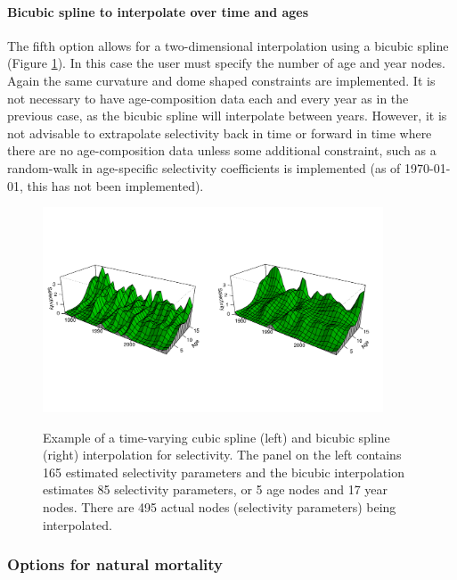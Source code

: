 \paragraph{Bicubic spline to interpolate over time and ages}  The fifth option allows for a two-dimensional interpolation using a bicubic spline (Figure \ref{Fig3}).  In this case the user must specify the number of age and year nodes.  Again the same curvature and dome shaped constraints are implemented.  It is not necessary to have age-composition data each and every year as in the previous case, as the bicubic spline will interpolate between years.  However, it is not advisable to extrapolate selectivity back in time or forward in time where there are no age-composition data unless some additional constraint, such as a random-walk in age-specific selectivity coefficients is implemented (as of \today, this has not been implemented).

\begin{figure}[!tbp]
	\centering
	\includegraphics[width=0.9\textwidth]{Figs/BicubicEg.pdf}\\
	\caption{Example of a time-varying cubic spline (left) and bicubic spline (right) interpolation for selectivity. The panel on the left contains 165 estimated selectivity parameters and the bicubic interpolation estimates 85 selectivity parameters, or 5 age nodes and 17 year nodes. There are 495 actual nodes (selectivity parameters) being interpolated.}\label{Fig3}
\end{figure}






		\subsubsection{Options for natural mortality}
		
